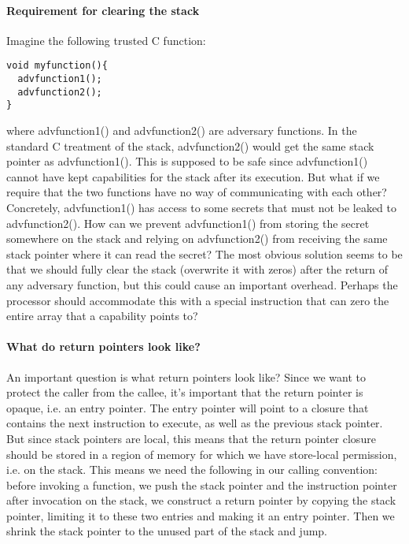 \documentclass[a4paper]{article}
\begin{document}
\begin{lemma}
\paragraph{Requirement for clearing the stack}
Imagine the following trusted C function:

\begin{verbatim}
void myfunction(){
  advfunction1();
  advfunction2();
}
\end{verbatim}

where advfunction1() and advfunction2() are adversary functions. In the standard
C treatment of the stack, advfunction2() would get the same stack pointer as
advfunction1(). This is supposed to be safe since advfunction1() cannot have
kept capabilities for the stack after its execution. But what if we require that
the two functions have no way of communicating with each other? Concretely,
advfunction1() has access to some secrets that must not be leaked to
advfunction2(). How can we prevent advfunction1() from storing the secret
somewhere on the stack and relying on advfunction2() from receiving the same
stack pointer where it can read the secret? The most obvious solution seems to
be that we should fully clear the stack (overwrite it with zeros) after the
return of any adversary function, but this could cause an important overhead.
Perhaps the processor should accommodate this with a special instruction that can
zero the entire array that a capability points to?

\paragraph{What do return pointers look like?}
An important question is what return pointers look like? Since we want to
protect the caller from the callee, it's important that the return pointer is
opaque, i.e. an entry pointer. The entry pointer will point to a closure that
contains the next instruction to execute, as well as the previous stack pointer.
But since stack pointers are local, this means that the return pointer closure
should be stored in a region of memory for which we have store-local permission,
i.e. on the stack. This means we need the following in our calling convention:
before invoking a function, we push the stack pointer and the instruction
pointer after invocation on the stack, we construct a return pointer by
copying the stack pointer, limiting it to these two entries and making it an
entry pointer.  Then we shrink the stack pointer to the unused part of the stack
and jump. 


\end{lemma}
\end{document}
